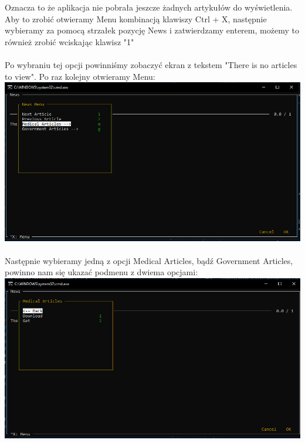 \documentclass{article}
\begin{document}
Oznacza to że aplikacja nie pobrała jeszcze żadnych artykułów do wyświetlenia. Aby to zrobić otwieramy Menu kombinacją klawiszy Ctrl + X,
następnie wybieramy za pomocą strzałek pozycję News i zatwierdzamy enterem, możemy to również zrobić wciskając klawisz "1"

\paragraph{}
Po wybraniu tej opcji powinniśmy zobaczyć ekran z tekstem "There is no articles to view". Po raz kolejny otwieramy Menu: \\
\includegraphics[width=\textwidth]{images/news_screen_menu.png}

\pagebreak

\paragraph{}
Następnie wybieramy jedną z opcji Medical Articles, bądź Government Articles, powinno nam się ukazać podmenu z dwiema opcjami:\\
\includegraphics[width=\textwidth]{images/news_screen_sub_menu.png}
\end{document}
